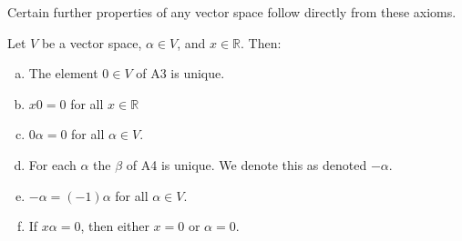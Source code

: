 \documentclass[12pt,letterpaper,reqno]{article}
\numberwithin{equation}{section}
\begin{document}
Certain further properties of any vector space follow directly from these axioms.

\begin{thm}\label{thm:properties_of_vector_spaces}
	Let $V$ be a vector space, $\alpha \in V$, and $x \in \mathbb{R}$. Then:
	\begin{enumerate}[(a)]
		\item The element $0 \in V$ of A3 is unique.
		\item $x0=0$ for all $x\in \mathbb{R}$ 
		\item $0\alpha=0$ for all $\alpha \in V$.
		\item For each $\alpha$ the $\beta$ of A4 is unique. We denote this as denoted $-\alpha$.
		\item $-\alpha=(-1)\alpha$ for all $\alpha \in  V$.
		\item If $x\alpha=0$, then either $x=0$ or $\alpha=0$.
	\end{enumerate}
\end{thm}
\end{document}
